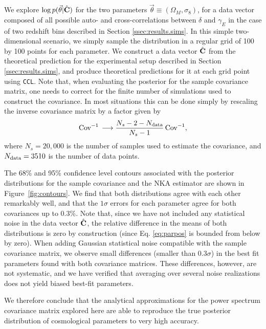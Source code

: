 \documentclass[a4paper,11pt]{article}
\newcommand{\cgg}[1]{{\color{olive} #1}}
\begin{document}
      We explore $\log p(\vec{\theta}|\hat{\bf C})$ for \cgg{the} two parameters $\vec{\theta}\equiv(\Omega_M,\sigma_8)$, for a data vector composed of all possible auto- and cross-correlations between $\delta$ and $\gamma_E$ in the case of two redshift bins described in Section \ref{ssec:results.sims}. In this simple two-dimensional scenario, we simply sample the distribution in a regular grid of 100 by 100 points for each parameter. We construct a data vector $\hat{\bf C}$ from the theoretical prediction for the experimental setup described in Section \ref{ssec:results.sims}, and produce theoretical predictions for it at each grid point using {\tt CCL}. Note that, when evaluating the posterior for the sample covariance matrix, one needs to correct for the finite number of simulations used to construct the covariance. In most situations this can be done simply by rescaling the inverse covariance matrix by a factor given by \cite{2007A&A...464..399H}
      \begin{equation}\label{eq:hartlap}
        {\rm Cov}^{-1}\,\longrightarrow \frac{N_s-2-N_{\rm data}}{N_s-1}\,{\rm Cov}^{-1},
      \end{equation}
      where $N_s=20,000$ is the number of samples used to estimate the
      covariance, and $N_{\rm data}=3510$ is the number of data points.
      
      The 68\% and 95\% confidence level contours associated with the posterior distributions for the sample covariance and the NKA estimator are shown in Figure~\ref{fig:contours}. We find that both distributions agree with each other remarkably well, and that the $1\sigma$ errors for each parameter agree for both covariances up to $0.3\%$. Note that, since we have not included any statistical noise in the data vector $\hat{\bf C}$, the relative difference in the means of both distributions is zero by construction (since Eq. \ref{eq:parpos} is bounded from below by zero). When adding Gaussian statistical noise compatible with the sample covariance matrix, we observe small differences (smaller than 0.3$\sigma$) in the best fit parameters found with both covariance matrices. These differences, however, are not systematic, and we have verified that averaging over several noise realizations does not yield biased best-fit parameters.
      
      We therefore conclude that the analytical approximations for the power spectrum covariance matrix explored here are able to reproduce the true posterior distribution of cosmological parameters to very high accuracy.
\end{document}
